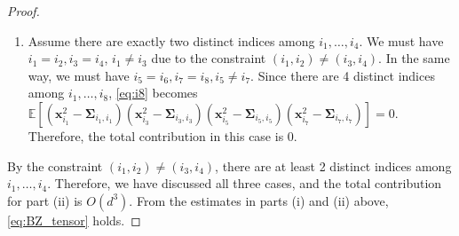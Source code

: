 \documentclass[10pt,a4paper]{amsart}
\newcommand{\E}{\mathbb{E}}
\def\bSigma{{\boldsymbol \Sigma}}
\def\bx{{\boldsymbol x}}
\begin{document}
\begin{proof}
\begin{enumerate}
   
    \item  Assume there are exactly two distinct indices among $i_1,\dots, i_4$. We must have $i_1=i_2,i_3=i_4$, $i_1\not=i_3$ due to the constraint $(i_1,i_2)\not=(i_3,i_4)$.  In the same way, we must have $i_5=i_6, i_7=i_8, i_5\not=i_7$. 
Since there are 4 distinct indices among  $i_1,\dots,i_8$,   \eqref{eq:i8} becomes
  $ 
\E[(\bx_{i_1}^2-\bSigma_{i_1,i_1})(\bx_{i_3}^2-\bSigma_{i_3,i_3})(\bx_{i_5}^2-\bSigma_{i_5,i_5})(\bx_{i_7}^2-\bSigma_{i_7,i_7})]=0$.
    Therefore, the total contribution in this case is $0$.
\end{enumerate}
By the constraint $(i_1,i_2)\not=(i_3,i_4)$, there are at least 2 distinct indices among $i_1,\dots,i_4$. Therefore, we have discussed all three cases, and the total contribution for part (ii) is $O(d^3)$.
From the estimates in parts (i) and (ii) above, \eqref{eq:BZ_tensor} holds. 
\end{proof}
\end{document}
